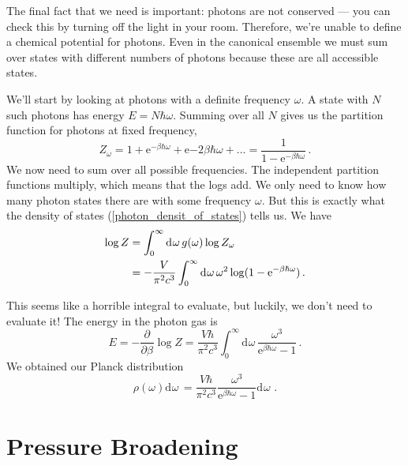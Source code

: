 \documentclass{article}
\theoremstyle{plain}\theoremheaderfont{\normalfont\itshape}\theorembodyfont{\rmfamily}\theoremseparator{.}\newtheorem*{rem}{Remark}\newtheorem*{ex}{Example}\newtheorem*{proof}{Proof}\newtheorem*{altp}{Alternative proof}
\theoremstyle{plain}\theoremheaderfont{\normalfont\bfseries}\theorembodyfont{\rmfamily}\theoremseparator{.}\newtheorem{thm}{Theorem}[section]\newtheorem{lem}[thm]{Lemma}\newtheorem{prop}[thm]{Proposition}\newtheorem*{cor}{Corollary}\newtheorem{defn}[thm]{Definition}\newtheorem{clm}[thm]{Claim}\newtheorem{clminproof}{Claim}\newtheorem{pos}{Postulate}[section]
\theoremstyle{break}\theoremheaderfont{\normalfont\itshape}\theorembodyfont{\rmfamily}\theoremseparator{.\medskip}\newtheorem*{proofskip}{Proof}\newtheorem*{exs}{Examples}\newtheorem*{rems}{Remarks}
\theoremstyle{break}\theoremheaderfont{\normalfont\bfseries}\theorembodyfont{\rmfamily}\theoremseparator{.\medskip}\newtheorem{lemskip}[thm]{Lemma}\newtheorem{defnskip}[thm]{Definition}\newtheorem{propskip}[thm]{Proposition}\newtheorem{thmskip}[thm]{Theorem}
\numberwithin{equation}{section}
\newcommand{\ee}{\mathrm{e}}
\newcommand{\dd}[2][]{\mathrm{d}^{#1} #2\,}
\newcommand{\pdv}[3][]{\frac{\partial^{#1} #2}{{\partial #3}^{#1}}}
\begin{document}
    The final fact that we need is important: photons are not conserved --- you can check this by turning off the light in your room. Therefore, we're unable to define a chemical potential for photons. Even in the canonical ensemble we must sum over states with different numbers of photons because these are all accessible states.

    We'll start by looking at photons with a definite frequency \(\omega\). A state with \(N\) such photons has energy \(E=N\hbar\omega\). Summing over all \(N\) gives us the partition function for photons at fixed frequency,
    \begin{equation}
        Z_\omega=1+\ee^{-\beta\hbar\omega}+\ee{-2\beta\hbar\omega}+\dots=\frac{1}{1-\ee^{-\beta\hbar\omega}}\,.
    \end{equation}
    We now need to sum over all possible frequencies. The independent partition functions multiply, which means that the logs add. We only need to know how many photon states there are with some frequency \(\omega\). But this is exactly what the density of states (\ref{photon_densit_of_states}) tells us. We have
    \begin{align}
        \log Z&=\int_{0}^{\infty}\dd{\omega}g(\omega)\log Z_\omega\notag\\
        &=-\frac{V}{\pi^2 c^3}\int_{0}^{\infty}\dd{\omega}\omega^2\log(1-\ee^{-\beta\hbar\omega})\,.
    \end{align}

    This seems like a horrible integral to evaluate, but luckily, we don't need to evaluate it! The energy in the photon gas is
    \begin{equation}
        E=-\pdv{}{\beta}\log Z=\frac{V\hbar}{\pi^2 c^3}\int_{0}^{\infty}\dd{\omega}\frac{\omega^3}{\ee^{\beta\hbar\omega}-1}\,.
    \end{equation}
    We obtained our Planck distribution
    \begin{equation}
        \rho(\omega)\dd{\omega}=\frac{V\hbar}{\pi^2 c^3}\frac{\omega^3}{\ee^{\beta\hbar\omega}-1}\dd{\omega}\,.
    \end{equation}
    \section{Pressure Broadening}\label{Chap:Pressure_broadening}
    \begin{figure}[ht!]
        \centering
    \end{figure}
\end{document}
